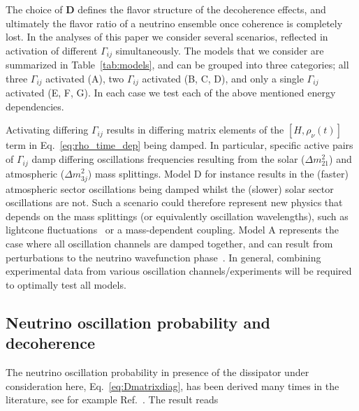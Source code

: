 \documentclass[aps, prd, onecolumn, tightenlines, notitlepage, superscriptaddress, nofootinbib, preprintnumbers, floatfix,showkeys,11pt]{revtex4-2}
\begin{document}
The choice of {\bf{D}} defines the flavor structure of the decoherence effects, and ultimately the flavor ratio of a  neutrino ensemble once coherence is completely lost. In the analyses of this paper we consider several scenarios, reflected in activation of different $\Gamma_{ij}$ simultaneously. The models that we consider are summarized in Table~\ref{tab:models}, and can be grouped into three categories; all three $\Gamma_{ij}$ activated (A), two $\Gamma_{ij}$ activated (B, C, D), and only a single $\Gamma_{ij}$ activated (E, F, G). In each case we test each of the above mentioned energy dependencies.

Activating differing $\Gamma_{ij}$ results in differing matrix elements of the $[H,\rho_\nu(t)]$ term in Eq.~\eqref{eq:rho_time_dep} being damped. In particular, specific active pairs of $\Gamma_{ij}$ damp differing oscillations frequencies resulting from the solar ($\Delta m^2_{21}$) and atmospheric ($\Delta m^2_{3j}$) mass splittings. Model D for instance results in the (faster) atmospheric sector oscillations being damped whilst the (slower) solar sector oscillations are not. Such a scenario could therefore represent new physics that depends on the mass splittings (or equivalently oscillation wavelengths), such as lightcone fluctuations~\cite{Stuttard:2021uyw} or a mass-dependent coupling. Model A represents the case where all oscillation channels are damped together, and can result from perturbations to the neutrino wavefunction phase~\cite{Stuttard:2020qfv}. In general, combining experimental data from various oscillation channels/experiments will be required to optimally test all models.

\subsection{Neutrino oscillation probability and decoherence}
\label{sec:osc_prob}

The neutrino oscillation probability in presence of the dissipator under consideration here, Eq.~\eqref{eq:Dmatrixdiag}, has been derived many times in the literature, see for example Ref.~\cite{BalieiroGomes:2018gtd}. The result reads
\end{document}
